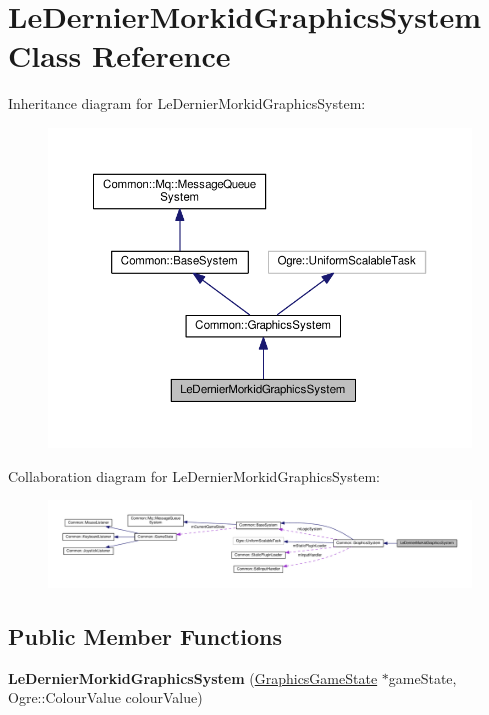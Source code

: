 \hypertarget{class_le_dernier_morkid_graphics_system}{}\section{Le\+Dernier\+Morkid\+Graphics\+System Class Reference}
\label{class_le_dernier_morkid_graphics_system}


Inheritance diagram for Le\+Dernier\+Morkid\+Graphics\+System\+:\nopagebreak
\begin{figure}[H]
\begin{center}
\leavevmode
\includegraphics[width=350pt]{class_le_dernier_morkid_graphics_system__inherit__graph}
\end{center}
\end{figure}


Collaboration diagram for Le\+Dernier\+Morkid\+Graphics\+System\+:\nopagebreak
\begin{figure}[H]
\begin{center}
\leavevmode
\includegraphics[width=350pt]{class_le_dernier_morkid_graphics_system__coll__graph}
\end{center}
\end{figure}
\subsection*{Public Member Functions}
\begin{DoxyCompactItemize}
\item 
\mbox{\label{class_le_dernier_morkid_graphics_system_a99bf6e88562a001af561567044cd4fd3}} 
{\bfseries Le\+Dernier\+Morkid\+Graphics\+System} (\hyperlink{class_graphics_game_state}{Graphics\+Game\+State} $\ast$game\+State, Ogre\+::\+Colour\+Value colour\+Value)
\end{DoxyCompactItemize}
